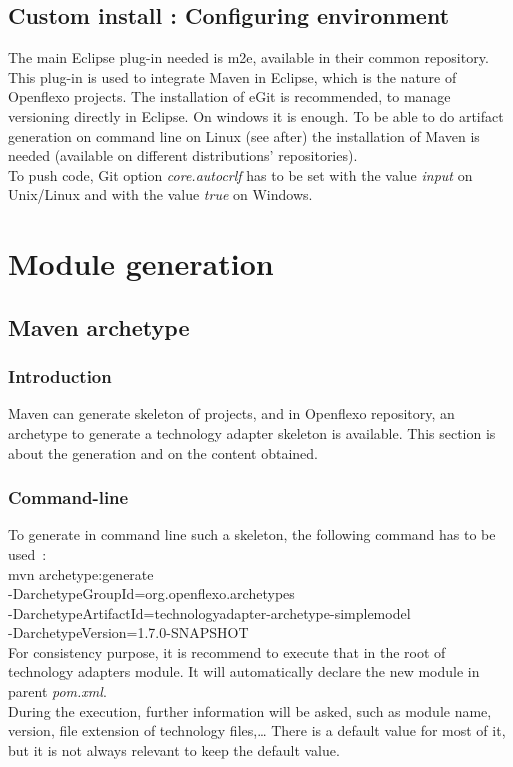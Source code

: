 \documentclass[9pt,a4paper]{article}
\begin{document}
	\subsection{Custom install : Configuring environment}
	The main Eclipse plug-in needed is m2e, available in their common repository. This plug-in is used to integrate Maven in Eclipse, which is the nature of Openflexo projects. The installation of eGit is recommended, to manage versioning directly in Eclipse. On windows it is enough. To be able to do artifact generation on command line on Linux (see after) the installation of Maven is needed (available on different distributions' repositories).\\
	To push code, Git option \textit{core.autocrlf} has to be set with the value \textit{input} on Unix/Linux and with the value \textit{true} on Windows.
	
\section{Module generation}
	\subsection{Maven archetype}
		\subsubsection{Introduction}
		Maven can generate skeleton of projects, and in Openflexo repository, an archetype to generate a technology adapter skeleton is available. This section is about the generation and on the content obtained.
	
		\subsubsection{Command-line}
		To generate in command line such a skeleton, the following command has to be used~:\\
		mvn archetype:generate\\
		\indent-DarchetypeGroupId=org.openflexo.archetypes\\
		\indent-DarchetypeArtifactId=technologyadapter-archetype-simplemodel\\
		\indent-DarchetypeVersion=1.7.0-SNAPSHOT\\
		For consistency purpose, it is recommend to execute that in the root of technology adapters module. It will automatically declare the new module in parent \textit{pom.xml}.\\
		During the execution, further information will be asked, such as module name, version, file extension of technology files,… There is a default value for most of it, but it is not always relevant to keep the default value.
	
\end{document}
